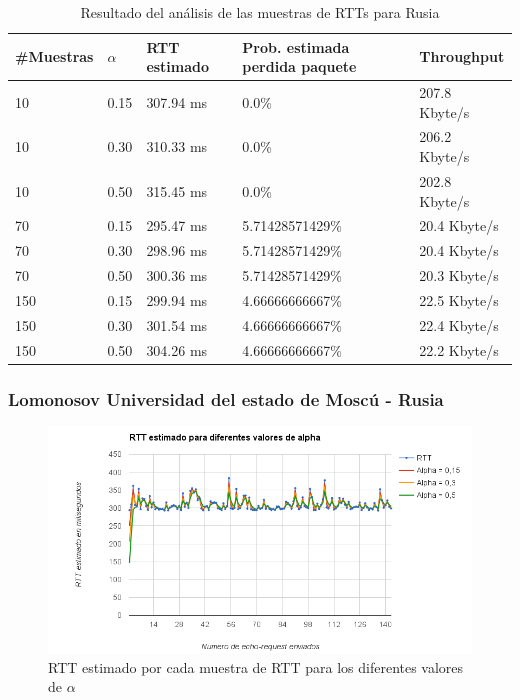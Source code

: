 \begin{table}[H]
	\centering
    \begin{tabular}{lllll}
    \hline
    \#Muestras & $\alpha$ & RTT estimado &Prob. estimada perdida paquete & Throughput \\	\hline
    10   &  0.15  &  307.94 ms  &  0.0\%  &  207.8 Kbyte/s  \\
    10   &  0.30  &  310.33 ms  &  0.0\%  &  206.2 Kbyte/s  \\
    10   &  0.50  &  315.45 ms  &  0.0\%  &  202.8 Kbyte/s  \\
    70   &  0.15  &  295.47 ms  &  5.71428571429\%  &  20.4 Kbyte/s  \\
    70   &  0.30  &  298.96 ms  &  5.71428571429\%  &  20.4 Kbyte/s  \\
    70   &  0.50  &  300.36 ms  &  5.71428571429\%  &  20.3 Kbyte/s  \\
    150  &  0.15  &  299.94 ms  &  4.66666666667\%  &  22.5 Kbyte/s  \\
    150  &  0.30  &  301.54 ms  &  4.66666666667\%  &  22.4 Kbyte/s  \\
    150  &  0.50  &  304.26 ms  &  4.66666666667\%  &  22.2 Kbyte/s  \\ \hline
    \end{tabular}
    \caption{Resultado del análisis de las muestras de RTTs para Rusia}
  \label{fig:tabla-ertt-rus}
\end{table}

\subsubsection{Lomonosov Universidad del estado de Moscú - Rusia}

\begin{figure}[H]
\begin{changemargin}{-5cm}{-5cm}
    \includegraphics[width=1.5\textwidth]{../Experimentacion/Rusia/ertt.png}
    \caption{RTT estimado por cada muestra de RTT para los diferentes valores de $\alpha$}
  \label{ertt-rus}
\end{changemargin}
\end{figure}

